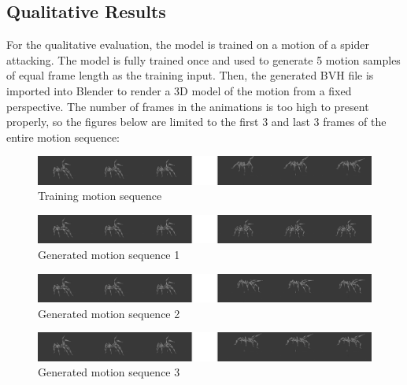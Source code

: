 \documentclass[a4paper, 12pt]{report}
\begin{document}
\subsection{Qualitative Results}
For the qualitative evaluation, the model is trained on a motion of a spider attacking. The model is fully trained once and used to generate 5 motion samples of equal frame length as the training input. Then, the generated BVH file is imported into Blender \cite{blender_blenderorg_2024} to render a 3D model of the motion from a fixed perspective. The number of frames in the animations is too high to present properly, so the figures below are limited to the first 3 and last 3 frames of the entire motion sequence:
\begin{figure}[H]
	\centering
	\includegraphics[width=\textwidth]{GeneratedMotions/image_reel_03.png}
	\caption{Training motion sequence}
	\label{training_image}
\end{figure}

\begin{figure}[H]
	\centering
	\includegraphics[width=\textwidth]{GeneratedMotions/image_reel_00.png}
	\caption{Generated motion sequence 1}
	\label{image_00}
\end{figure}

\begin{figure}[H]
	\centering
	\includegraphics[width=\textwidth]{GeneratedMotions/image_reel_01.png}
	\caption{Generated motion sequence 2}
	\label{image_01}
\end{figure}

\begin{figure}[H]
	\centering
	\includegraphics[width=\textwidth]{GeneratedMotions/image_reel_02.png}
	\caption{Generated motion sequence 3}
	\label{image_02}
\end{figure}
\end{document}
